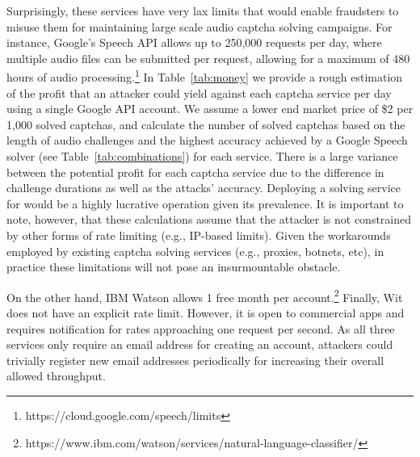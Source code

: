 Surprisingly, these services have very lax limits that would enable fraudsters to misuse
them for maintaining large scale audio captcha solving campaigns. For instance, Google's Speech API allows up
to 250,000 requests per day, where multiple audio files can be submitted per request, allowing for a maximum of
480 hours of audio processing.\footnote{https://cloud.google.com/speech/limits}
In Table~\ref{tab:money} we provide a rough estimation of the profit that an attacker could yield against 
each captcha service per day using a single Google API account. We assume a lower end market price of \$2 
per 1,000 solved captchas, and calculate the number of solved captchas based on the length of audio challenges 
and the highest accuracy achieved by a Google Speech solver (see Table~\ref{tab:combinations}) for each service.
There is a large variance between the potential profit for each captcha service due to the difference in challenge
durations as well as the attacks' accuracy. Deploying a solving service for \re would be a highly lucrative
operation given its prevalence.
It is important to note, however, that these calculations assume that the attacker 
is not constrained by other forms of rate limiting (e.g., IP-based limits). Given the workarounds employed
by existing captcha solving services (e.g., proxies, botnets, etc), in practice these limitations will not 
pose an insurmountable obstacle.

On the other hand, IBM Watson allows 1 free month per account.\footnote{https://www.ibm.com/watson/services/natural-language-classifier/}
Finally, Wit does not have an explicit rate limit. However, it is open to commercial
apps and requires notification for rates approaching one request per second. As all three services
only require an email address for creating an account, attackers could trivially register 
new email addresses periodically for increasing their overall allowed throughput.





